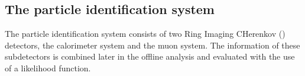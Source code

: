 
\subsection{The particle identification system}
The \lhcb particle identification system consists of two Ring Imaging CHerenkov (\rich) detectors, the calorimeter system and the muon system. The information of these subdetectors is combined later in the offline analysis and evaluated with the use of a likelihood function.\\

